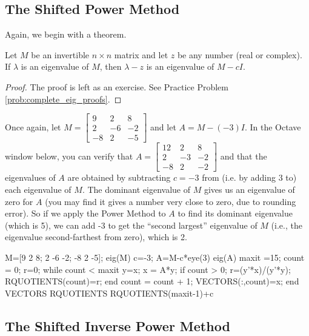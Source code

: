 \documentclass{ximera}
\begin{document}
\subsection*{The Shifted Power Method}
Again, we begin with a theorem.

\begin{theorem}\label{th:eig_shifted}
Let $M$ be an invertible $n \times n$ matrix and let $z$ be any number (real or complex).  If $\lambda$ is an eigenvalue of $M$, then $\lambda - z$ is an eigenvalue of $M - cI$.
\end{theorem}

\begin{proof}
The proof is left as an exercise.  See Practice Problem \ref{prob:complete_eig_proofs}.
\end{proof}

Once again, let $M=\left[ \begin{array}{rrr}
9 & 2 & 8 \\
2 & -6 & -2 \\
-8 & 2 & -5
\end{array}\right]$ and let $A=M - (-3)I$.  In the Octave window below, you can verify that $A=\left[ \begin{array}{rrr}
12 & 2 & 8 \\
2 & -3 & -2 \\
-8 & 2 & -2
\end{array}\right]$ and that the eigenvalues of $A$ are obtained by subtracting $c=-3$ from (i.e. by adding 3 to) each eigenvalue of $M$.  The dominant eigenvalue of $M$ gives us an eigenvalue of zero for $A$ (you may find it gives a number very close to zero, due to rounding error).  So if we apply the Power Method to $A$ to find its dominant eigenvalue (which is 5), we can add -3 to get the ``second largest'' eigenvalue of $M$ (i.e., the eigenvalue second-farthest from zero), which is 2.

M=[9 2 8; 2 -6 -2; -8 2 -5];
eig(M)
c=-3;
A=M-c*eye(3) %
eig(A)
maxit =15; %
count = 0;
r=0;
    while count < maxit
    y=x;
    x = A*y;
        if count > 0; 
        r=(y'*x)/(y'*y);
        RQUOTIENTS(count)=r;
        end
    count = count + 1;
    VECTORS(:,count)=x;
end
VECTORS
RQUOTIENTS
RQUOTIENTS(maxit-1)+c

\subsection*{The Shifted Inverse Power Method}
\end{document}
